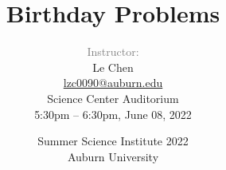 


\title %
{
  Birthday Problems \\
  \bigskip
  \small
}


\author{
  \textcolor{gray}{Instructor:}\\[1em]
  Le Chen\\
  {\small\url{lzc0090@auburn.edu}}\\[2em]
  {\small Science Center Auditorium}\\[1em]
  {\small 5:30pm -- 6:30pm, June 08, 2022}
}



\date[Auburn]{
  Summer Science Institute 2022\\
  Auburn University
}



